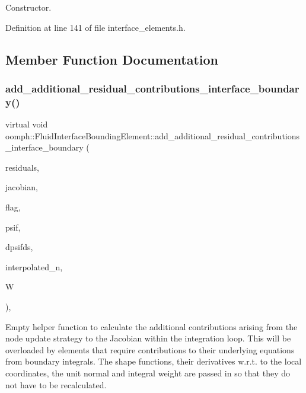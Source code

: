 Constructor. 



Definition at line 141 of file interface\+\_\+elements.\+h.



\subsection{Member Function Documentation}
\mbox{\label{classoomph_1_1FluidInterfaceBoundingElement_a4510bd81b572d758694715f673080041}} 
\subsubsection{\texorpdfstring{add\+\_\+additional\+\_\+residual\+\_\+contributions\+\_\+interface\+\_\+boundary()}{add\_additional\_residual\_contributions\_interface\_boundary()}}
{\footnotesize\ttfamily virtual void oomph\+::\+Fluid\+Interface\+Bounding\+Element\+::add\+\_\+additional\+\_\+residual\+\_\+contributions\+\_\+interface\+\_\+boundary (\begin{DoxyParamCaption}\item[{Vector$<$ double $>$ \&}]{residuals,  }\item[{Dense\+Matrix$<$ double $>$ \&}]{jacobian,  }\item[{const unsigned \&}]{flag,  }\item[{const Shape \&}]{psif,  }\item[{const D\+Shape \&}]{dpsifds,  }\item[{const Vector$<$ double $>$ \&}]{interpolated\+\_\+n,  }\item[{const double \&}]{W }\end{DoxyParamCaption})\hspace{0.3cm}{\ttfamily [inline]}, {\ttfamily [virtual]}}



Empty helper function to calculate the additional contributions arising from the node update strategy to the Jacobian within the integration loop. This will be overloaded by elements that require contributions to their underlying equations from boundary integrals. The shape functions, their derivatives w.\+r.\+t. to the local coordinates, the unit normal and integral weight are passed in so that they do not have to be recalculated. 



